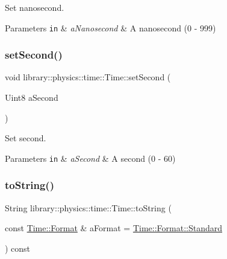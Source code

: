 Set nanosecond. 


\begin{DoxyParams}[1]{Parameters}
\mbox{\tt in}  & {\em a\+Nanosecond} & A nanosecond (0 -\/ 999) \\
\hline
\end{DoxyParams}
\mbox{\label{classlibrary_1_1physics_1_1time_1_1_time_add6193c6d0e3f4c0d9bdb78c1020fea2}} 
\subsubsection{\texorpdfstring{set\+Second()}{setSecond()}}
{\footnotesize\ttfamily void library\+::physics\+::time\+::\+Time\+::set\+Second (\begin{DoxyParamCaption}\item[{Uint8}]{a\+Second }\end{DoxyParamCaption})}



Set second. 


\begin{DoxyParams}[1]{Parameters}
\mbox{\tt in}  & {\em a\+Second} & A second (0 -\/ 60) \\
\hline
\end{DoxyParams}
\mbox{\label{classlibrary_1_1physics_1_1time_1_1_time_a9cd369886bade37d48146afc0d7a2271}} 
\subsubsection{\texorpdfstring{to\+String()}{toString()}}
{\footnotesize\ttfamily String library\+::physics\+::time\+::\+Time\+::to\+String (\begin{DoxyParamCaption}\item[{const \hyperlink{classlibrary_1_1physics_1_1time_1_1_time_a7cfbcbb1d5d0c536e28e61f1e7cbf1c8}{Time\+::\+Format} \&}]{a\+Format = {\ttfamily \hyperlink{classlibrary_1_1physics_1_1time_1_1_time_a7cfbcbb1d5d0c536e28e61f1e7cbf1c8aeb6d8ae6f20283755b339c0dc273988b}{Time\+::\+Format\+::\+Standard}} }\end{DoxyParamCaption}) const}



